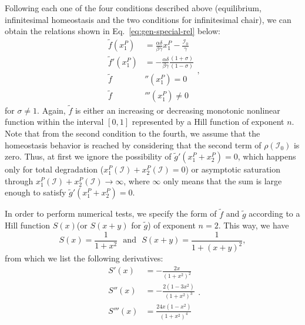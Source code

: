 Following each one of the four conditions described above (equilibrium, infinitesimal homeostasis
and the two conditions for infinitesimal chair), we can obtain the relations shown in 
Eq.~\ref{eq:gen-special-rel} below:
\begin{equation} \label{eq:gen-special-rel}
    \begin{aligned} \tilde{f}(x_1^P) &= \frac{\alpha \delta}{\beta \gamma}x_1^P - \frac{\mathcal{I}_0}{\gamma} \\
    \tilde{f}'(x_1^P) &= - \frac{\alpha\delta}{\beta\gamma}\frac{(1+\sigma)}{(1-\sigma)} \\ 
    \tilde{f}&''(x_1^P) = 0 \\ 
    \tilde{f}&'''(x_1^P) \neq 0  
    \end{aligned},
\end{equation}
for $\sigma \neq 1$. Again, $\tilde{f}$ is either an increasing or decreasing monotonic 
nonlinear function within the interval $[0,1]$ represented by a Hill function of exponent $n$. 
Note that from the second condition to the fourth, we assume that the 
homeostasis behavior is reached by considering that the second term of $\rho(\mathcal{I}_0)$
is zero. Thus, at first we ignore the possibility of $\tilde{g}'(x_1^P + x_2^P) = 0$, which 
happens only for total degradation ($x_1^P(\mathcal{I}) + x_2^P(\mathcal{I}) = 0$) or asymptotic saturation
through $x_1^P(\mathcal{I}) + x_2^P(\mathcal{I}) \rightarrow \infty$, where $\infty$ only means that the
sum is large enough to satisfy $\tilde{g}'(x_1^P + x_2^P) = 0$.

In order to perform numerical tests, we specify the form of $\tilde{f}$ and $\tilde{g}$
according to a Hill function $S(x)$(or $S(x+y)$ for $\tilde{g}$) of exponent $n = 2$.
This way, we have 
\begin{equation} \label{eq:hill2}
    S(x) = \frac{1}{1+x^2} \ \ \ \text{and} \ \ \ S(x+y) = \frac{1}{1+(x+y)^2},
\end{equation}
from which we list the following derivatives:
\begin{equation} \label{eq:s-derivatives}
    \begin{aligned}
        S'(x) &= -\frac{2x}{(1+x^2)^2} \\
        S''(x) &= -\frac{2(1-3x^2)}{(1+x^2)^3}\\
        S'''(x) &= \frac{24x(1-x^2)}{(1+x^2)^4}
    \end{aligned}.
\end{equation}

